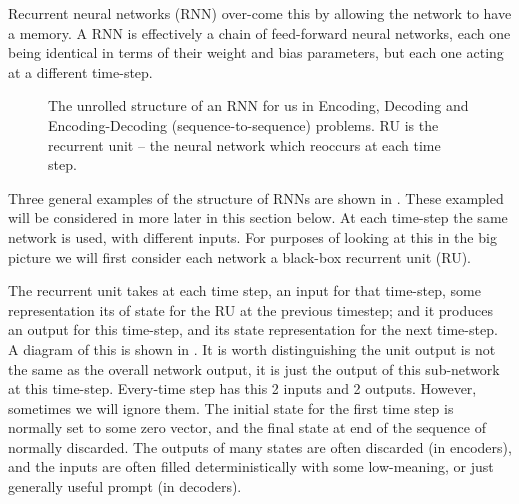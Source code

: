 \documentclass[12pt,parskip]{komatufte}
\begin{document}
Recurrent neural networks (RNN) over-come this by allowing the network to have a memory.
A RNN is effectively a chain of feed-forward neural networks,
each one being identical in terms of their weight and bias parameters,
but each one acting at a different time-step.



\begin{figure}
	\caption{The unrolled structure of an RNN for us in Encoding, Decoding and Encoding-Decoding (sequence-to-sequence) problems. RU is the recurrent unit -- the neural network which reoccurs at each time step.}
	
	\label{fig-rnns}
	
	\resizebox{\textwidth}{!}{}
\end{figure}



Three general examples of the structure of RNNs are shown in .
These exampled will be considered in more later in this section below.
At each time-step the same network is used, with different inputs.
For purposes of looking at this in the big picture we will first consider each network a black-box recurrent unit (RU).



The recurrent unit takes at each time step, an input for that time-step, some representation its of state for the RU at the previous timestep; and it produces an output for this time-step, and its state representation for the next time-step.
A diagram of this is shown in .
It is worth distinguishing the unit output is not the same as the overall network output, it is just the output of this sub-network at this time-step.
Every-time step has this 2 inputs and 2 outputs.
However, sometimes we will ignore them.
The initial state for the first time step is normally set to some zero vector,
and the final state at end of the sequence of normally discarded.
The outputs of many states are often discarded (in encoders), and the inputs are often filled deterministically with some low-meaning, or just generally useful prompt (in decoders).
\end{document}
